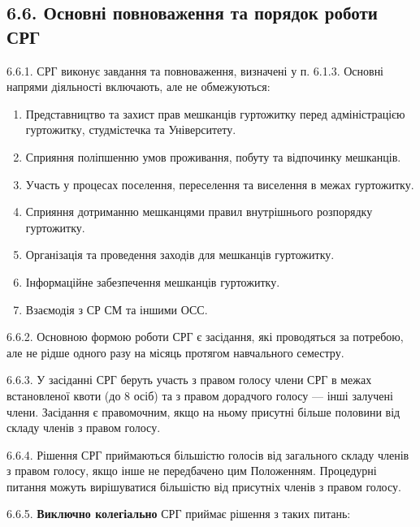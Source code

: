 \subsection*{6.6. Основні повноваження та порядок роботи СРГ}
    6.6.1. СРГ виконує завдання та повноваження, визначені у п. 6.1.3. Основні напрями діяльності включають, але не обмежуються:

        \begin{enumerate}[label=\alph*)]
            \item Представництво та захист прав мешканців гуртожитку перед адміністрацією гуртожитку, студмістечка та Університету.
            \item Сприяння поліпшенню умов проживання, побуту та відпочинку мешканців.
            \item Участь у процесах поселення, переселення та виселення в межах гуртожитку.
            \item Сприяння дотриманню мешканцями правил внутрішнього розпорядку гуртожитку.
            \item Організація та проведення заходів для мешканців гуртожитку.
            \item Інформаційне забезпечення мешканців гуртожитку.
            \item Взаємодія з СР СМ та іншими ОСС.
        \end{enumerate}

    6.6.2. Основною формою роботи СРГ є засідання, які проводяться за потребою, але не рідше одного разу на місяць протягом навчального семестру.

    6.6.3. У засіданні СРГ беруть участь з правом голосу члени СРГ в межах встановленої квоти (до 8 осіб) та з правом дорадчого голосу — інші залучені члени. Засідання є правомочним, якщо на ньому присутні більше половини від складу членів з правом голосу.

    6.6.4. Рішення СРГ приймаються більшістю голосів від загального складу членів з правом голосу, якщо інше не передбачено цим Положенням. Процедурні питання можуть вирішуватися більшістю від присутніх членів з правом голосу.

    6.6.5. \textbf{Виключно колегіально} СРГ приймає рішення з таких питань:

